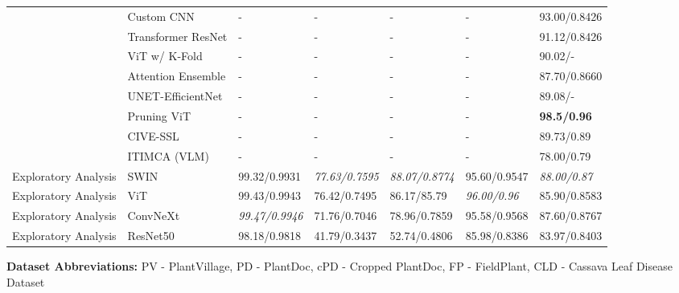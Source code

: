 \documentclass[sn-mathphys]{sn-jnl}
\theoremstyle{thmstyleone}%
\theoremstyle{thmstyletwo}%
\theoremstyle{thmstylethree}%
\begin{document}
\begin{table}[h!]
\begin{tabular}{@{}p{2cm}p{1.5cm}p{1.2cm}p{1.2cm}p{1.2cm}p{1.2cm}p{1.2cm}@{}}
    \citet{sambasivam2021predictive} & Custom CNN & - & - & - & - & 93.00/0.8426 \\
    \citet{zhong2022classification} & Transformer ResNet & - & - & - & - & 91.12/0.8426 \\
    \citet{zhuang2021deep} & ViT w/ K-Fold & - & - & - & - & 90.02/- \\
    \citet{ravi2022attention} & Attention Ensemble & - & - & - & - & 87.70/0.8660 \\
    \citet{maryum2021cassava} & UNET-EfficientNet & - & - & - & - & 89.08/- \\
    \citet{thai2023formerleaf} & Pruning ViT & - & - & - & - & \textbf{98.5/0.96} \\
    \citet{divya_cassava} & CIVE-SSL & - & - & - & - & 89.73/0.89 \\
    \citet{LI2025106981} & ITIMCA (VLM) & - & - & - & - & 78.00/0.79 \\
    \midrule 
    Exploratory Analysis & SWIN & 99.32/0.9931& \textit{77.63/0.7595}& \textit{88.07/0.8774}& 95.60/0.9547& \textit{88.00/0.87}\\
    Exploratory Analysis & ViT & 99.43/0.9943 & 76.42/0.7495& 86.17/85.79& \textit{96.00/0.96}& 85.90/0.8583\\
    Exploratory Analysis & ConvNeXt & \textit{99.47/0.9946}& 71.76/0.7046& 78.96/0.7859& 95.58/0.9568& 87.60/0.8767\\
    Exploratory Analysis & ResNet50 & 98.18/0.9818& 41.79/0.3437& 52.74/0.4806& 85.98/0.8386& 83.97/0.8403\\
    \bottomrule
  \end{tabular}
  
  \vspace{0.2cm}
  \footnotesize
  \textbf{Dataset Abbreviations:} PV - PlantVillage, PD - PlantDoc, cPD - Cropped PlantDoc, FP - FieldPlant, CLD - Cassava Leaf Disease Dataset
\end{table}
\end{document}
